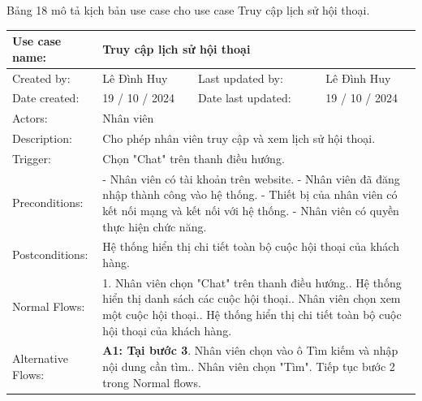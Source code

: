 Bảng 18 mô tả kịch bản use case cho use case Truy cập lịch sử hội thoại.

\begin{table}[H]
    \centering
    \begin{tabular}{|l|l|l|l|} 
        \hline
        Use case name: & \multicolumn{3}{|l|}{Truy cập lịch sử hội thoại} \\
        \hline
        Created by: & Lê Đình Huy & Last updated by: & Lê Đình Huy \\
        \hline
        Date created: & 19 / 10 / 2024 & Date last updated: & 19 / 10 / 2024 \\
        \hline
        Actors: & \multicolumn{3}{|l|}{Nhân viên} \\
        \hline
        Description: & \multicolumn{3}{|p{12cm}|}{Cho phép nhân viên truy cập và xem lịch sử hội thoại.} \\ 
        \hline
        Trigger: & \multicolumn{3}{|p{12cm}|}{Chọn "Chat" trên thanh điều hướng.} \\
        \hline
        Preconditions: & \multicolumn{3}{|p{12cm}|}{- Nhân viên có tài khoản trên website. \newline
        - Nhân viên đã đăng nhập thành công vào hệ thống. \newline
        - Thiết bị của nhân viên có kết nối mạng và kết nối với hệ thống. \newline
        - Nhân viên có quyền thực hiện chức năng.} \\
        \hline
        Postconditions: & \multicolumn{3}{|p{12cm}|}{Hệ thống hiển thị chi tiết toàn bộ cuộc hội thoại của khách hàng.} \\
        \hline
        Normal Flows: & \multicolumn{3}{|p{12cm}|}{1. Nhân viên chọn "Chat" trên thanh điều hướng.\newline
        2. Hệ thống hiển thị danh sách các cuộc hội thoại.\newline
        3. Nhân viên chọn xem một cuộc hội thoại.\newline
        4. Hệ thống hiển thị chi tiết toàn bộ cuộc hội thoại của khách hàng.}\\
        \hline
        Alternative Flows: & \multicolumn{3}{|p{12cm}|}{
        \textbf{A1: Tại bước 3}\newline
        3.1. Nhân viên chọn vào ô Tìm kiếm và nhập nội dung cần tìm.\newline
        3.2. Nhân viên chọn "Tìm".\newline
        Tiếp tục bước 2 trong Normal flows.\newline
}
\end{tabular}
\end{table}
